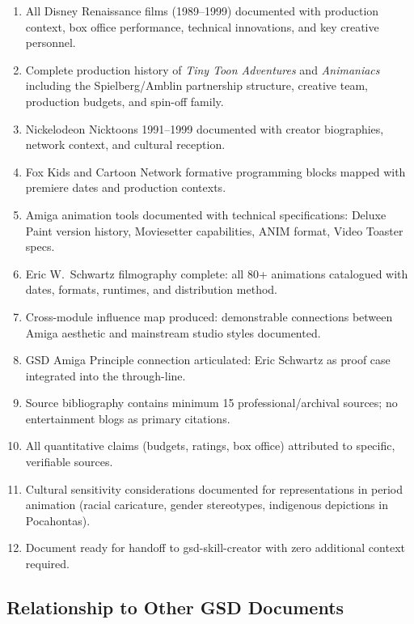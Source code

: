 \documentclass[11pt,letterpaper]{article}
\begin{document}
\begin{enumerate}[leftmargin=2em]
  \item All Disney Renaissance films (1989--1999) documented with production context, box office performance, technical innovations, and key creative personnel.
  \item Complete production history of \textit{Tiny Toon Adventures} and \textit{Animaniacs} including the Spielberg/Amblin partnership structure, creative team, production budgets, and spin-off family.
  \item Nickelodeon Nicktoons 1991--1999 documented with creator biographies, network context, and cultural reception.
  \item Fox Kids and Cartoon Network formative programming blocks mapped with premiere dates and production contexts.
  \item Amiga animation tools documented with technical specifications: Deluxe Paint version history, Moviesetter capabilities, ANIM format, Video Toaster specs.
  \item Eric W.\ Schwartz filmography complete: all 80+ animations catalogued with dates, formats, runtimes, and distribution method.
  \item Cross-module influence map produced: demonstrable connections between Amiga aesthetic and mainstream studio styles documented.
  \item GSD Amiga Principle connection articulated: Eric Schwartz as proof case integrated into the through-line.
  \item Source bibliography contains minimum 15 professional/archival sources; no entertainment blogs as primary citations.
  \item All quantitative claims (budgets, ratings, box office) attributed to specific, verifiable sources.
  \item Cultural sensitivity considerations documented for representations in period animation (racial caricature, gender stereotypes, indigenous depictions in Pocahontas).
  \item Document ready for handoff to gsd-skill-creator with zero additional context required.
\end{enumerate}

\subsection{Relationship to Other GSD Documents}
\end{document}
